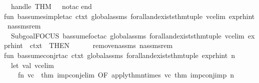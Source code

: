 \begin{isabellebody}
\ \ handle\ THM\ {\isacharunderscore}{\kern0pt}\ {\isacharequal}{\kern0pt}{\isachargreater}{\kern0pt}\ no{\isacharunderscore}{\kern0pt}tac\isanewline
end\isanewline
\isanewline
fun\ b{\isacharunderscore}{\kern0pt}assume{\isacharunderscore}{\kern0pt}simple{\isacharunderscore}{\kern0pt}tac\ ctxt\ global{\isacharunderscore}{\kern0pt}assms\ forall{\isacharunderscore}{\kern0pt}and{\isacharunderscore}{\kern0pt}exists{\isacharunderscore}{\kern0pt}thm{\isacharunderscore}{\kern0pt}tuple\ vc{\isacharunderscore}{\kern0pt}elim\ expr{\isacharunderscore}{\kern0pt}hint\ n{\isacharunderscore}{\kern0pt}assms{\isacharunderscore}{\kern0pt}rem\ {\isacharequal}{\kern0pt}\isanewline
\ \ {\isacharparenleft}{\kern0pt}Subgoal{\isachardot}{\kern0pt}FOCUS\ {\isacharparenleft}{\kern0pt}b{\isacharunderscore}{\kern0pt}assume{\isacharunderscore}{\kern0pt}foc{\isacharunderscore}{\kern0pt}tac\ global{\isacharunderscore}{\kern0pt}assms\ forall{\isacharunderscore}{\kern0pt}and{\isacharunderscore}{\kern0pt}exists{\isacharunderscore}{\kern0pt}thm{\isacharunderscore}{\kern0pt}tuple\ vc{\isacharunderscore}{\kern0pt}elim\ expr{\isacharunderscore}{\kern0pt}hint\ {}{\isacharparenright}{\kern0pt}\ ctxt\ {}{\isacharparenright}{\kern0pt}\ THEN\ \ \ \isanewline
\ \ \ remove{\isacharunderscore}{\kern0pt}n{\isacharunderscore}{\kern0pt}assms\ n{\isacharunderscore}{\kern0pt}assms{\isacharunderscore}{\kern0pt}rem\ {}\isanewline
\isanewline
\isanewline
fun\ b{\isacharunderscore}{\kern0pt}assume{\isacharunderscore}{\kern0pt}conjr{\isacharunderscore}{\kern0pt}tac\ ctxt\ global{\isacharunderscore}{\kern0pt}assms\ forall{\isacharunderscore}{\kern0pt}and{\isacharunderscore}{\kern0pt}exists{\isacharunderscore}{\kern0pt}thm{\isacharunderscore}{\kern0pt}tuple\ expr{\isacharunderscore}{\kern0pt}hint\ n\ {\isacharequal}{\kern0pt}\isanewline
\ \ let\ val\ vc{\isacharunderscore}{\kern0pt}elim\ {\isacharequal}{\kern0pt}\ \isanewline
\ \ \ \ fn\ {\isacharparenleft}{\kern0pt}vc{\isacharparenright}{\kern0pt}\ {\isacharequal}{\kern0pt}{\isachargreater}{\kern0pt}\ {\isacharat}{\kern0pt}{\isacharbraceleft}{\kern0pt}thm\ imp{\isacharunderscore}{\kern0pt}conj{\isacharunderscore}{\kern0pt}elim{\isacharbraceright}{\kern0pt}\ OF\ {\isacharbrackleft}{\kern0pt}{\isacharparenleft}{\kern0pt}apply{\isacharunderscore}{\kern0pt}thm{\isacharunderscore}{\kern0pt}n{\isacharunderscore}{\kern0pt}times\ vc\ {\isacharat}{\kern0pt}{\isacharbraceleft}{\kern0pt}thm\ imp{\isacharunderscore}{\kern0pt}conj{\isacharunderscore}{\kern0pt}imp{\isacharbraceright}{\kern0pt}\ {\isacharparenleft}{\kern0pt}n{\isacharminus}{\kern0pt}{}{\isacharparenright}{\kern0pt}{\isacharparenright}{\kern0pt}{\isacharbrackright}{\kern0pt}\isanewline

\end{isabellebody}
